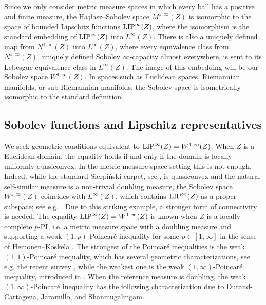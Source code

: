 \documentclass[reqno]{amsart}
\newcommand{\LIP}{{\rm LIP}}
\numberwithin{equation}{section}
\theoremstyle{remark}
\begin{document}
Since we only consider metric measure spaces in which every ball has a positive and finite measure, the Haj{\l}asz--Sobolev space $M^{1,\infty}(Z)$ is isomorphic to the space of bounded Lipschitz functions $\LIP^{\infty}(Z)$, where the isomorphism is the standard embedding of $\LIP^{\infty}(Z)$ into $L^{\infty}(Z)$. There is also a uniquely defined map from $N^{1,\infty}(Z)$ into $L^{\infty}(Z)$, where every equivalence class from $N^{1,\infty}(Z)$, uniquely defined Sobolev $\infty$-capacity almost everywhere, is sent to its Lebesgue equivalence class in $L^{\infty}(Z)$. The image of this embedding will be our Sobolev space $W^{1,\infty}(Z)$. In spaces such as Euclidean spaces, Riemannian manifolds, or sub-Riemannian manifolds, the Sobolev space is isometrically isomorphic to the standard definition.



\subsection{Sobolev functions and Lipschitz representatives}
We seek geometric conditions equivalent to $\LIP^{\infty}(Z) = W^{1,\infty}(Z)$. When $Z$ is a Euclidean domain, the equality holds if and only if the domain is locally uniformly quasiconvex. In the metric measure space setting this is not enough. Indeed, while the standard Sierpi\'nski carpet, see , is quasiconvex and the natural self-similar measure is a non-trivial doubling measure, the Sobolev space $W^{1,\infty}(Z)$ coincides with $L^{\infty}(Z)$, which contains $\LIP^{\infty}(Z)$ as a proper subspace; see e.g. \cite[Section 9]{Bj:Bj:Mal:25}. Due to this striking example, a stronger form of connectivity is needed. The equality $\LIP^{\infty}(Z) = W^{1,\infty}(Z)$ is known when $Z$ is a locally complete $p$-PI, i.e. a metric measure space with a doubling measure and supporting a weak $(1,p)$-Poincaré inequality for some $p \in [1,\infty]$ in the sense of Heinonen--Koskela \cite{Hei:Ko:98}. The strongest of the Poincaré inequalities is the weak $(1,1)$-Poincaré inequality, which has several geometric characterizations, see e.g. the recent survey \cite{Caputo}, while the weakest one is the weak $(1,\infty)$-Poincaré inequality, introduced in \cite{Durand,Durand_2}. When the reference measure is doubling, the weak $(1,\infty)$-Poincaré inequality has the following characterization due to Durand-Cartagena, Jaramillo, and Shanmugalingam.
\end{document}
